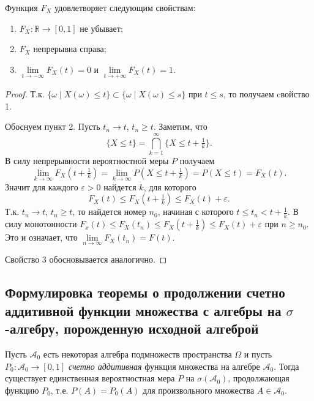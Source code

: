 \begin{proposal*}
    Функция $F_X$ удовлетворяет следующим свойствам:
    \begin{enumerate}
        \item $F_X\colon \mathbb{R}\to [0, 1]$ не убывает;
        \item $F_X$ непрерывна справа;
        \item $\lim\limits_{t \to -\infty} F_X(t) = 0$ и $\lim\limits_{t \to +\infty} F_X(t) = 1$.
    \end{enumerate}
\end{proposal*}

\begin{proof}
    Т.к. $\{\omega \mid X(\omega) \leqslant t\} \subset \{\omega \mid X(\omega) \leqslant s\}$ при $t \leqslant s$, то получаем cвойство 1.

    \noindent Обоснуем пункт 2.
    Пусть $t_n \to t$, $t_n \geqslant t$.
    Заметим, что
    \[
        \{X \leqslant t\} = \bigcap\limits_{k = 1}^\infty\{X \leqslant t + \tfrac{1}{k}\}.
    \]
    В силу непрерывности вероятностной меры $P$ получаем
    \[
        \lim_{k \to \infty}F_X(t + \tfrac{1}{k}) = \lim_{k \to \infty}P(X \leqslant t + \tfrac{1}{k}) = P(X \leqslant t) = F_X(t).
    \]
    Значит для каждого $\varepsilon > 0$ найдется $k$, для которого
    \[
        F_X(t) \leqslant F_X(t + \tfrac{1}{k}) \leqslant F_X(t) + \varepsilon.
    \]
    Т.к. $t_n \to t$, $t_n \geqslant t$, то найдется номер $n_0$, начиная с которого $t \leqslant t_n < t + \frac{1}{k}$.
    В силу монотонности $F_x(t) \leqslant F_X(t_n) \leqslant F_X(t + \frac{1}{k}) \leqslant F_X(t) + \varepsilon$
    при $n\geqslant n_0$.
    Это и означает, что $\lim\limits_{n \to \infty}F_X(t_n) = F(t)$.

    Свойство 3 обосновывается аналогично.
\end{proof}

\sectionbreak
\subsection{Формулировка теоремы о продолжении счетно аддитивной функции множества с алгебры на $\sigma$-алгебру, порожденную исходной алгеброй}

\begin{theorem}[б/д]
    Пусть $\mathcal{A}_0$ есть некоторая алгебра подмножеств пространства $\Omega$ и пусть $P_0 \colon \mathcal{A}_0 \to [0, 1]$ {\it счетно аддитивная} функция множества на алгебре $\mathcal{A}_0$.
    Тогда существует единственная вероятностная мера $P$ на $\sigma(\mathcal{A}_0)$, продолжающая функцию $P_0$, т.е. $P(A) = P_0(A)$ для произвольного множества $A\in\mathcal{A}_0$.
\end{theorem}

